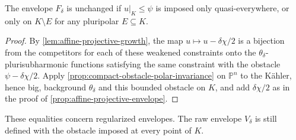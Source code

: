 \begin{corollary}\label{cor:affine-polar-obstacle-invariance}
The envelope $F_\delta$ is unchanged if $u|_K\leq\psi$ is imposed only quasi-everywhere, or only on $K\setminus E$ for any pluripolar $E\subseteq K$.
\end{corollary}
\begin{proof}
By \cref{lem:affine-projective-growth}, the map $u\mapsto u-\delta\chi/2$ is a bijection from the competitors for each of these weakened constraints onto the $\theta_\delta$-plurisubharmonic functions satisfying the same constraint with the obstacle $\psi-\delta\chi/2$. Apply \cref{prop:compact-obstacle-polar-invariance} on $\mathbb P^n$ to the K\"ahler, hence big, background $\theta_\delta$ and this bounded obstacle on $K$, and add $\delta\chi/2$ as in the proof of \cref{prop:affine-projective-envelope}.
\end{proof}

These equalities concern regularized envelopes. The raw envelope $V_\delta$ is still defined with the obstacle imposed at every point of $K$.
